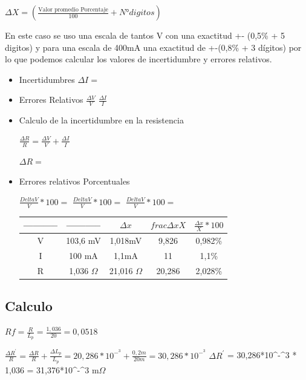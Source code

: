 \documentclass[12pt, letterpaper]{article}
\begin{document}
 
 $\Delta X=( \frac{\text{Valor promedio  Porcentaje}}{100} + N° digitos)$

     
    

\singlespacing

En este caso se uso una escala de tantos V con una exactitud +- (0,5\% + 5 digitos) y para una escala de 400mA una exactitud de +-(0,8\% + 3 dígitos)
por lo que podemos calcular los valores de incertidumbre y errores relativos.
\singlespacing  

\begin{itemize}
\item Incertidumbres\singlespacing
$\Delta I=$\singlespacing
\item Errores Relativos\singlespacing
$\frac{\Delta V}{V}$\singlespacing
$\frac{\Delta I}{I}$ \singlespacing
\item Calculo de la incertidumbre en la resistencia\singlespacing

$\frac{\Delta R}{R} =\frac{\Delta V}{V} + \frac{\Delta I}{I}$ \singlespacing

$\Delta R=$\singlespacing

\item Errores relativos Porcentuales\singlespacing

$\frac{Delta V}{V} * 100=$\singlespacing
$\frac{Delta V}{V} * 100=$\singlespacing
$\frac{Delta V}{V} * 100=$\singlespacing
 
\begin{center}
	\begin{tabular}{|c|c|c|c|c|}
	\hline
	----------- & ----------- & $\Delta x$  & $frac{\Delta x}{X}$  & $\frac{\Delta x}{X} *100$ \\ \hline
	V           & 103,6 mV    & 1,018mV & 9,826      & 0,982\%        \\ \hline
	I           & 100 mA      & 1,1mA   & 11         & 1,1\%          \\ \hline
	R           & 1,036    $\Omega$    & 21,016 $\Omega$  & 20,286     & 2,028\%        \\ \hline
	\end{tabular}
	\end{center}
\end{itemize}
\singlespacing
\subsection{Calculo}

$Rf= \frac{R}{L_{p}} = \frac{1,036}{20} = 0,0518$ 
\singlespacing

$\frac{ \Delta R^'}{R} = \frac{\Delta R}{R} + \frac{\Delta L_{p}}{L_{p}} = 20,286*10^-^3 + \frac{0,2m}{20m} = 30,286*10^-^3$  
\singlespacing
$\Delta R^'$ = 30,286*10^-^3 * 1,036 = 31,376*10^-^3 m$\Omega$
\end{document}
